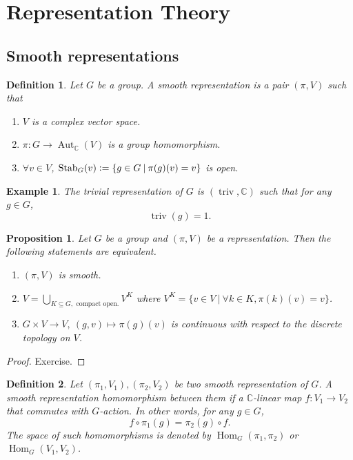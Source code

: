 \documentclass[8pt]{article}
\newtheorem{proposition}{Proposition}[section]
\newtheorem{definition}{Definition}[section]
\newtheorem{example}{Example}[section]
\DeclareMathOperator{\triv}{triv}
\DeclareMathOperator{\Aut}{Aut}
\DeclareMathOperator{\Stab}{Stab}
\DeclareMathOperator{\Hom}{Hom}
\newcommand{\defeq}{\vcentcolon=}
\newcommand{\C}[0]{\mathbb{C}}
\begin{document}
\section{Representation Theory}

\subsection{Smooth representations}

\begin{definition}
Let $G$ be a group. A smooth representation is a pair $(\pi,V)$ such that 
\begin{enumerate}[1).]
\item $V$ is a complex vector space.
\item $\pi:G\to \Aut_\C(V)$ is a group homomorphism.
\item $\forall v\in V$, $\Stab_G(v)\defeq\{g\in G\:|\: \pi(g)(v) =v \}$ is open.
\end{enumerate}
\end{definition}

\begin{example}
The trivial representation of $G$ is $(\triv, \C)$ such that for any $g\in G$,
\begin{equation*}
\triv(g) = 1.
\end{equation*}
\end{example}

\begin{proposition}
Let $G$ be a group and $(\pi, V)$ be a representation. Then the following statements are equivalent. 
\begin{enumerate}[1).]
\item $(\pi,V)$ is smooth.
\item $V = \bigcup_{K\subseteq G,\text{ compact open.}}V^K$ where $V^K = \{v\in V\:|\: \forall k\in K, \pi(k)(v) = v\}$.
\item $G\times V\to V,\: (g,v)\mapsto\pi(g)(v)$ is continuous with respect to the discrete topology on $V$.
\end{enumerate}

\label{representation_smooth_equivalence}
\end{proposition}

\begin{proof}
Exercise.
\end{proof}

\begin{definition}
Let $(\pi_1,V_1),(\pi_2,V_2)$ be two smooth representation of $G$. A smooth representation homomorphism between them if a $\C$-linear map $f:V_1\to V_2$ that commutes with $G$-action. In other words, for any $g\in G$, 
\begin{equation*}
f\circ\pi_1(g) =\pi_2(g)\circ f.
\end{equation*}
The space of such homomorphisms is denoted by $\Hom_G(\pi_1,\pi_2)$ or $\Hom_G(V_1,V_2)$. 
\end{definition}
\end{document}
